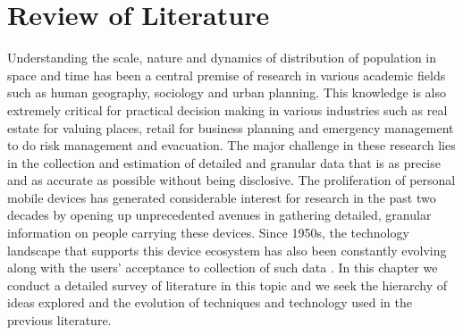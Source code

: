 \chapter{Review of Literature}

Understanding the scale, nature and dynamics of distribution of population in space and time has been a central premise of research in various academic fields such as human geography, sociology and urban planning.
This knowledge is also extremely critical for practical decision making in various industries such as real estate for valuing places, retail for business planning and emergency management to do risk management and evacuation.
The major challenge in these research lies in the collection and estimation of detailed and granular data that is as precise and as accurate as possible without being disclosive.
The proliferation of personal mobile devices has generated considerable interest for research in the past two decades by opening up unprecedented avenues in gathering detailed, granular information on people carrying these devices.
Since 1950s, the technology landscape that supports this device ecosystem has also been constantly evolving along with the users’ acceptance to collection of such data \cite{kobsa2014user}.
In this chapter we conduct a detailed survey of literature in this topic and we seek the hierarchy of ideas explored and the evolution of techniques and technology used in the previous literature.


\pagebreak


\pagebreak


